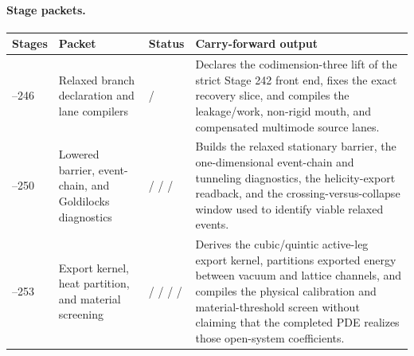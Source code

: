 \paragraph{Stage packets.}
\begin{center}
\small
\begin{tabular}{@{}>{\raggedright\arraybackslash}p{}>{\raggedright\arraybackslash}p{}>{\raggedright\arraybackslash}p{}>{\raggedright\arraybackslash}p{}@{}}
\toprule
Stages & Packet & Status & Carry-forward output \\
\midrule
243--246 & Relaxed branch declaration and lane compilers & \StatusEffective{} / \StatusExactClosure{} & Declares the codimension-three lift of the strict Stage 242 front end, fixes the exact recovery slice, and compiles the leakage/work, non-rigid mouth, and compensated multimode source lanes. \\
\addlinespace
247--250 & Lowered barrier, event-chain, and Goldilocks diagnostics & \StatusExactClosure{} / \StatusEffective{} / \StatusReduced{} / \StatusNumerical{} & Builds the relaxed stationary barrier, the one-dimensional event-chain and tunneling diagnostics, the helicity-export readback, and the crossing-versus-collapse window used to identify viable relaxed events. \\
\addlinespace
251--253 & Export kernel, heat partition, and material screening & \StatusExactClosure{} / \StatusReduced{} / \StatusEffective{} / \StatusNumerical{} / \StatusOpen{} & Derives the cubic/quintic active-leg export kernel, partitions exported energy between vacuum and lattice channels, and compiles the physical calibration and material-threshold screen without claiming that the completed PDE realizes those open-system coefficients. \\
\bottomrule
\end{tabular}
\end{center}


